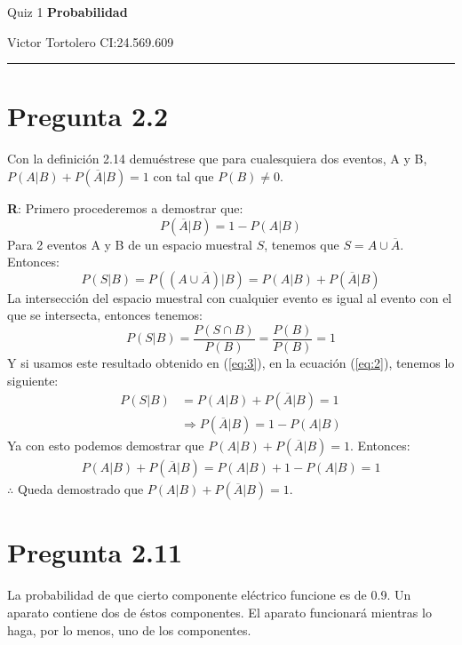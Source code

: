 \documentclass{article}
\newcommand{\prob}[1]{{P} \left( {#1} \right)}
\begin{document}
\flushleft
\setlength{\parindent}{20pt}

\justify
\centerline{\huge Quiz 1 \textbf{Probabilidad}}
\centerline{Victor Tortolero CI:24.569.609}  %
\vspace{0.1cm}
\hrule

\section*{Pregunta 2.2}
Con la definición 2.14 demuéstrese que para cualesquiera dos eventos, A y B, $\prob{A | B} + \prob{\overline{A} | B} = 1$ con tal
que $\prob{B} \neq 0$.

\textbf{R}: Primero procederemos a demostrar que:
\begin{equation*} \label{eq:1}
	\prob{\overline{A} | B} = 1 - \prob{A | B}
\end{equation*}
Para 2 eventos A y B de un espacio muestral $S$,
tenemos que $S = A \cup \overline{A}$. Entonces:
\begin{equation}\label{eq:2}
	\prob{S | B} = 
	\prob{(A \cup \overline{A}) | B} =
	\prob{A | B} + \prob{\overline{A} | B}
\end{equation}
La intersección del espacio muestral con cualquier evento es igual al evento con el que se intersecta, entonces tenemos:
\begin{equation}\label{eq:3}
\prob{S | B} = 
\frac{\prob{S \cap B}}{\prob{B}} =
\frac{\prob{B}}{\prob{B}} =
1
\end{equation}
Y si usamos este resultado obtenido en (\ref{eq:3}), en la ecuación (\ref{eq:2}), tenemos lo siguiente:
\begin{align*}
	\prob{S | B} & = \prob{A | B} + \prob{\overline{A} | B} = 1 \\
	& \Rightarrow \prob{\overline{A} | B} = 1 - \prob{A | B}
\end{align*}
Ya con esto podemos demostrar que $\prob{A | B} + \prob{\overline{A} | B} = 1$. Entonces:
\begin{align*}
	\prob{A | B} + \prob{\overline{A} | B} = 
	\prob{A | B} + 1 - \prob{A | B} = 1
\end{align*}
$\therefore$ Queda demostrado que $\prob{A | B} + \prob{\overline{A} | B} = 1$.


\newpage
\section*{Pregunta 2.11}
La probabilidad de que cierto componente eléctrico funcione es de 0.9. Un aparato contiene dos de éstos componentes.
El aparato funcionará mientras lo haga, por lo menos, uno de los componentes.
\end{document}

